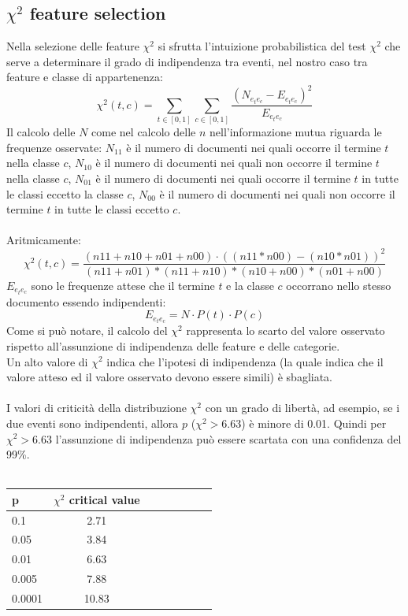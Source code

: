 \documentclass{article}
\theoremstyle{plain}
\theoremstyle{definition}
\begin{document}
\subsection{$\chi^2$ feature selection}
Nella selezione delle feature $\chi^2$ si sfrutta l'intuizione probabilistica del test $\chi^2$ che serve a determinare il grado di indipendenza tra eventi, nel nostro caso tra feature e classe di appartenenza:
$$\chi^2(t,c)=\sum_{t \in [0,1]} \sum_{c \in [0,1]} \frac{(N_{e_{t}e_{c}} - E_{e_{t}e_{c}})^2}{E_{e_{t}e_{c}}} $$  
Il calcolo delle $N$ come nel calcolo delle $n$ nell'informazione mutua riguarda le frequenze osservate: $N_{11}$ è il numero di documenti nei quali occorre il termine $t$ nella classe $c$, $N_{10}$ è il numero di documenti nei quali non occorre il termine $t$ nella classe $c$, $N_{01}$ è il numero di documenti nei quali occorre il termine $t$ in tutte le classi eccetto la classe $c$, $N_{00}$ è il numero di documenti nei quali non occorre il termine $t$ in tutte le classi eccetto $c$.
\\ 
\\
Aritmicamente:
$$\chi^2(t,c)=\frac{(n11+n10+n01+n00) \cdot ((n11*n00)-(n10*n01))^2}{(n11+n01)*(n11+n10)*(n10+n00)*(n01+n00)}
$$
$E_{e_{t}e_{c}}$ sono le frequenze attese che il termine $t$ e la classe $c$ occorrano nello stesso documento essendo indipendenti:
$$E_{e_{t}e_{c}} = N \cdot P(t) \cdot P(c)$$
Come si può notare, il calcolo del $\chi^2$ rappresenta lo scarto del valore osservato rispetto all'assunzione di indipendenza delle feature e delle categorie. 
\\
Un alto valore di $\chi^2$ indica che l'ipotesi di indipendenza (la quale indica che il valore atteso ed il valore osservato devono essere simili) è sbagliata.
\\
\\
I valori di criticità della distribuzione $\chi^2$ con un grado di libertà, ad esempio, se i due eventi sono indipendenti, allora $p$ ($\chi^2>6.63$) è minore di 0.01. Quindi per $\chi^2>6.63$ l'assunzione di indipendenza può essere scartata con una confidenza del 99\%.
\\
\\
\begin{tabular}{l*{6}{c}r}
p  & $\chi^2$ critical value \\
\hline
0.1 & 2.71 \\
0.05 & 3.84 \\
0.01 & 6.63 \\
0.005 & 7.88 \\
0.0001 & 10.83 \\

\end{tabular}
\end{document}
